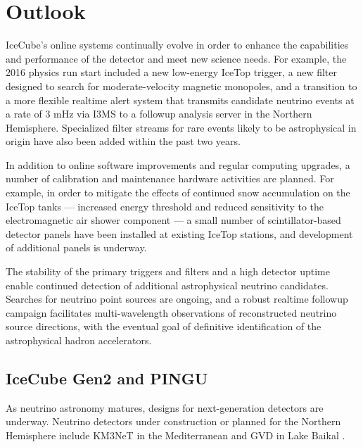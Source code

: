 \section{Outlook}

IceCube's online systems continually evolve in order to enhance the
capabilities and performance of the detector and meet new science needs.  
For example, the 2016 physics run start
included a new low-energy IceTop trigger, a new filter designed to search for
moderate-velocity magnetic monopoles, and a transition to a more flexible
realtime alert system that transmits candidate neutrino events at a rate of
3 mHz via I3MS to a followup analysis server in the Northern Hemisphere.
Specialized filter streams for rare events likely to be astrophysical in
origin have also been added within the past two years.  

In addition to online software improvements and regular computing upgrades, a
number of calibration and maintenance hardware activities are 
planned. For example, in order to mitigate the effects of continued snow
accumulation on the IceTop tanks --- increased energy threshold and reduced
sensitivity to the electromagnetic air shower component --- a small number
of scintillator-based  detector panels have been installed at existing
IceTop stations, and development of additional panels is underway.

The stability of the primary triggers and filters and a high detector
uptime enable continued detection of additional astrophysical neutrino
candidates.  Searches for neutrino point sources are ongoing, and a robust
realtime followup campaign facilitates multi-wavelength observations of
reconstructed neutrino source directions, with the eventual goal of
definitive identification of the astrophysical hadron accelerators.

\subsection{IceCube Gen2 and PINGU}

As neutrino astronomy matures, designs for next-generation detectors are underway.   Neutrino
detectors under construction or planned for the Northern Hemisphere include
KM3NeT in the Mediterranean \cite{km3net} and GVD in Lake Baikal \cite{gvd}.  

